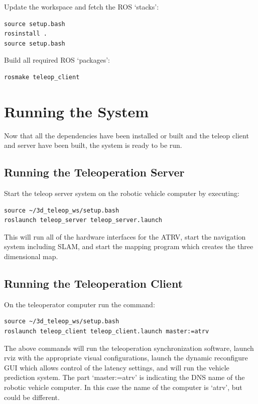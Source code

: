 \documentclass[12pt]{report}
\begin{document}
Update the workspace and fetch the ROS `stacks':

\begin{verbatim}
source setup.bash
rosinstall .
source setup.bash
\end{verbatim}

Build all required ROS `packages':

\begin{verbatim}
rosmake teleop_client
\end{verbatim}

\section{Running the System}
Now that all the dependencies have been installed or built and the teleop client and server have been built, the system is ready to be run.

\subsection{Running the Teleoperation Server}
Start the teleop server system on the robotic vehicle computer by executing:

\begin{verbatim}
source ~/3d_teleop_ws/setup.bash
roslaunch teleop_server teleop_server.launch
\end{verbatim}

This will run all of the hardware interfaces for the ATRV, start the navigation system including SLAM, and start the mapping program which creates the three dimensional map.

\subsection{Running the Teleoperation Client}
On the teleoperator computer run the command:

\begin{verbatim}
source ~/3d_teleop_ws/setup.bash
roslaunch teleop_client teleop_client.launch master:=atrv
\end{verbatim}

The above commands will run the teleoperation synchronization software, launch rviz with the appropriate visual configurations, launch the dynamic reconfigure GUI which allows control of the latency settings, and will run the vehicle prediction system.  The part `master:=atrv' is indicating the DNS name of the robotic vehicle computer.  In this case the name of the computer is `atrv', but could be different.
\end{document}
